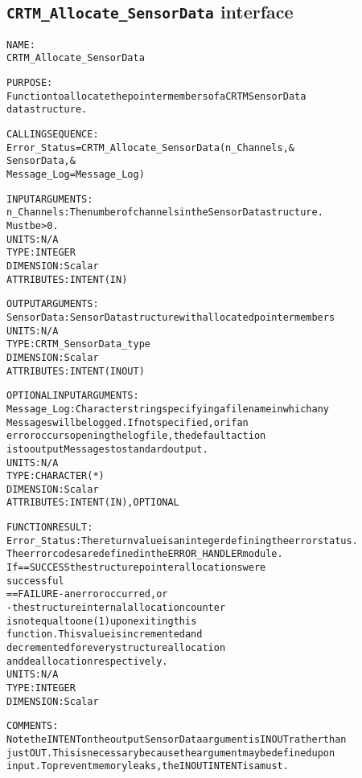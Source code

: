 \subsection{\texttt{CRTM\_Allocate\_SensorData} interface}
  \label{sec:CRTM_Allocate_SensorData_interface}
  \begin{alltt}
 
  NAME:
        CRTM_Allocate_SensorData
  
  PURPOSE:
        Function to allocate the pointer members of a CRTM SensorData
        data structure.
 
  CALLING SEQUENCE:
        Error_Status = CRTM_Allocate_SensorData( n_Channels             , &
                                                 SensorData             , &
                                                 Message_Log=Message_Log  )
 
  INPUT ARGUMENTS:
        n_Channels:   The number of channels in the SensorData structure.
                      Must be > 0.
                      UNITS:      N/A
                      TYPE:       INTEGER
                      DIMENSION:  Scalar
                      ATTRIBUTES: INTENT(IN)
 
  OUTPUT ARGUMENTS:
        SensorData:   SensorData structure with allocated pointer members
                      UNITS:      N/A
                      TYPE:       CRTM_SensorData_type
                      DIMENSION:  Scalar
                      ATTRIBUTES: INTENT(IN OUT)
 
 
  OPTIONAL INPUT ARGUMENTS:
        Message_Log:  Character string specifying a filename in which any
                      Messages will be logged. If not specified, or if an
                      error occurs opening the log file, the default action
                      is to output Messages to standard output.
                      UNITS:      N/A
                      TYPE:       CHARACTER(*)
                      DIMENSION:  Scalar
                      ATTRIBUTES: INTENT(IN), OPTIONAL
 
  FUNCTION RESULT:
        Error_Status: The return value is an integer defining the error status.
                      The error codes are defined in the ERROR_HANDLER module.
                      If == SUCCESS the structure pointer allocations were
                                    successful
                         == FAILURE - an error occurred, or
                                    - the structure internal allocation counter
                                      is not equal to one (1) upon exiting this
                                      function. This value is incremented and
                                      decremented for every structure allocation
                                      and deallocation respectively.
                      UNITS:      N/A
                      TYPE:       INTEGER
                      DIMENSION:  Scalar
 
  COMMENTS:
        Note the INTENT on the output SensorData argument is IN OUT rather than
        just OUT. This is necessary because the argument may be defined upon
        input. To prevent memory leaks, the IN OUT INTENT is a must.
 
  \end{alltt}
